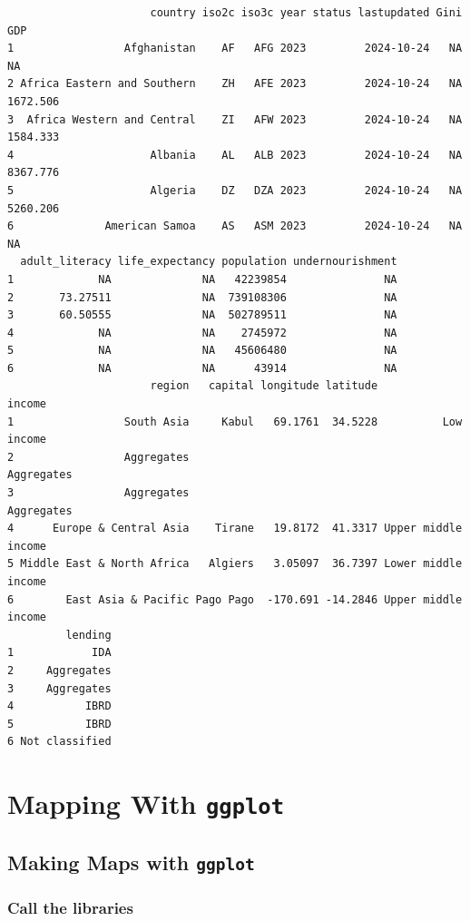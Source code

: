 \documentclass[
  letterpaper,
  DIV=11,
  numbers=noendperiod,
  oneside]{scrreprt}
\begin{document}
\begin{verbatim}
                      country iso2c iso3c year status lastupdated Gini      GDP
1                 Afghanistan    AF   AFG 2023         2024-10-24   NA       NA
2 Africa Eastern and Southern    ZH   AFE 2023         2024-10-24   NA 1672.506
3  Africa Western and Central    ZI   AFW 2023         2024-10-24   NA 1584.333
4                     Albania    AL   ALB 2023         2024-10-24   NA 8367.776
5                     Algeria    DZ   DZA 2023         2024-10-24   NA 5260.206
6              American Samoa    AS   ASM 2023         2024-10-24   NA       NA
  adult_literacy life_expectancy population undernourishment
1             NA              NA   42239854               NA
2       73.27511              NA  739108306               NA
3       60.50555              NA  502789511               NA
4             NA              NA    2745972               NA
5             NA              NA   45606480               NA
6             NA              NA      43914               NA
                      region   capital longitude latitude              income
1                 South Asia     Kabul   69.1761  34.5228          Low income
2                 Aggregates                                       Aggregates
3                 Aggregates                                       Aggregates
4      Europe & Central Asia    Tirane   19.8172  41.3317 Upper middle income
5 Middle East & North Africa   Algiers   3.05097  36.7397 Lower middle income
6        East Asia & Pacific Pago Pago  -170.691 -14.2846 Upper middle income
         lending
1            IDA
2     Aggregates
3     Aggregates
4           IBRD
5           IBRD
6 Not classified
\end{verbatim}

\part{Mapping With \texttt{ggplot}}

\chapter{\texorpdfstring{Making Maps with
\texttt{ggplot}}{Making Maps with ggplot}}\label{sec-ggplot-map}

\section{Call the libraries}\label{call-the-libraries-1}
\end{document}
